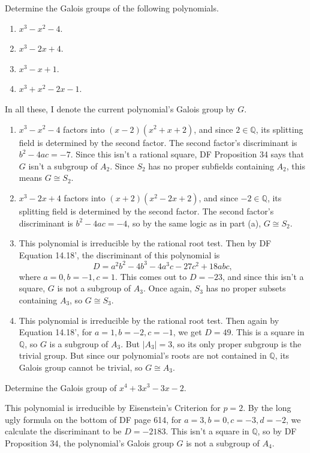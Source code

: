\documentclass[10pt]{report}
\begin{document}
\pagebreak
\begin{exer}[14.6: 2]
Determine the Galois groups of the following polynomials.
\begin{enumerate}
	\item $x^3-x^2-4$.
	\item $x^3-2x+4$.
	\item $x^3-x+1$.
	\item $x^3+x^2-2x-1$.
\end{enumerate}
\end{exer}
In all these, I denote the current polynomial's Galois group by $G$.
\begin{enumerate}
	\item $x^3-x^2-4$ factors into $(x-2)(x^2+x+2)$, and since $2 \in \mathbb{Q}$, its splitting field is determined by the second factor. The second factor's discriminant is $b^2-4ac=-7$. Since this isn't a rational square, DF Proposition 34 says that $G$ isn't a subgroup of $A_2$. Since $S_2$ has no proper subfields containing $A_2$, this means $G \cong S_2$.

	\item $x^3-2x+4$ factors into $(x+2)(x^2-2x+2)$, and since $-2 \in \mathbb{Q}$, its splitting field is determined by the second factor. The second factor's discriminant is $b^2-4ac=-4$, so by the same logic as in part (a), $G \cong S_2$.

	\item This polynomial is irreducible by the rational root test. Then by DF Equation 14.18', the discriminant of this polynomial is
		\[
		D=a^2b^2-4b^3-4a^3c-27c^2+18abc,
		\] where $a=0,b=-1,c=1$. This comes out to $D=-23$, and since this isn't a square, $G$ is not a subgroup of $A_3$. Once again, $S_3$ has no proper subsets containing $A_3$, so $G \cong S_3$.
	
	\item This polynomial is irreducible by the rational root test. Then again by Equation 14.18', for $a=1, b=-2, c=-1$, we get $D=49$. This is a square in $\mathbb{Q}$, so $G$ is a subgroup of $A_3$. But $|A_3|=3$, so its only proper subgroup is the trivial group. But since our polynomial's roots are not contained in $\mathbb{Q}$, its Galois group cannot be trivial, so $G \cong A_3$.
\end{enumerate}

\pagebreak
\begin{exer}[14.6: 6]
Determine the Galois group of $x^4+3x^3-3x-2$.
\end{exer}
This polynomial is irreducible by Eisenstein's Criterion for $p=2$. By the long ugly formula on the bottom of DF page 614, for $a=3,b=0,c=-3,d=-2$, we calculate the discriminant to be $D=-2183$. This isn't a square in $\mathbb{Q}$, so by DF Proposition 34, the polynomial's Galois group $G$ is not a subgroup of $A_4$.
\end{document}
